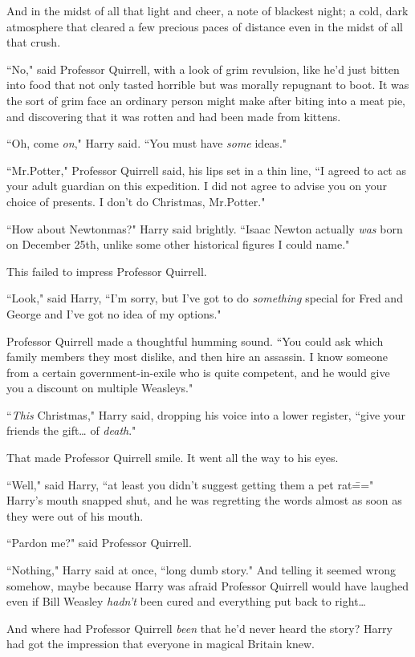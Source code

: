 And in the midst of all that light and cheer, a note of blackest night; a cold, dark atmosphere that cleared a few precious paces of distance even in the midst of all that crush.

``No," said Professor Quirrell, with a look of grim revulsion, like he'd just bitten into food that not only tasted horrible but was morally repugnant to boot. It was the sort of grim face an ordinary person might make after biting into a meat pie, and discovering that it was rotten and had been made from kittens.

``Oh, come \emph{on}," Harry said. ``You must have \emph{some} ideas."

``Mr.\?Potter," Professor Quirrell said, his lips set in a thin line, ``I agreed to act as your adult guardian on this expedition. I did not agree to advise you on your choice of presents. I don't do Christmas, Mr.\?Potter."

``How about Newtonmas?" Harry said brightly. ``Isaac Newton actually \emph{was} born on December 25th, unlike some other historical figures I could name."

This failed to impress Professor Quirrell.

``Look," said Harry, ``I'm sorry, but I've got to do \emph{something} special for Fred and George and I've got no idea of my options."

Professor Quirrell made a thoughtful humming sound. ``You could ask which family members they most dislike, and then hire an assassin. I know someone from a certain government-in-exile who is quite competent, and he would give you a discount on multiple Weasleys."

``\emph{This} Christmas," Harry said, dropping his voice into a lower register, ``give your friends the gift{\ldots} of \emph{death}."

That made Professor Quirrell smile. It went all the way to his eyes.

``Well," said Harry, ``at least you didn't suggest getting them a pet rat\===" Harry's mouth snapped shut, and he was regretting the words almost as soon as they were out of his mouth.

``Pardon me?" said Professor Quirrell.

``Nothing," Harry said at once, ``long dumb story." And telling it seemed wrong somehow, maybe because Harry was afraid Professor Quirrell would have laughed even if Bill Weasley \emph{hadn't} been cured and everything put back to right{\ldots}

And where had Professor Quirrell \emph{been} that he'd never heard the story? Harry had got the impression that everyone in magical Britain knew.

